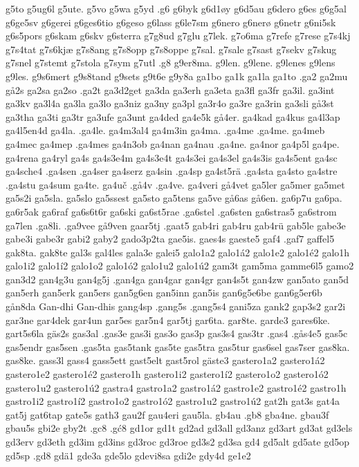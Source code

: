 g5to
g5ug6l
g5ute.
g5vo
g5wa
g5yd
.g6
g6byk
g6d1øy
g6d5au
g6dero
g6es
g6g5al
g6ge5sv
g6gerei
g6ges6tio
g6geso
g6lass
g6le7sm
g6nero
g6nerø
g6netr
g6ni5sk
g6s5pors
g6skam
g6skv
g6sterra
g7g8ud
g7glu
g7lek.
g7o6ma
g7refe
g7rese
g7s4kj
g7s4tat
g7s6kjæ
g7s8ang
g7s8opp
g7s8oppe
g7sal.
g7sale
g7sast
g7sekv
g7skug
g7snel
g7stemt
g7stola
g7sym
g7utl
.g8
g9er8ma.
g9len.
g9lene.
g9lenes
g9lens
g9les.
g9s6mert
g9s8tand
g9sets
g9t6e
g9y8a
ga1bo
ga1k
ga1la
ga1to
.ga2
ga2mu
gå2s
ga2sa
ga2so
.ga2t
ga3d2get
ga3da
ga3erh
ga3eta
ga3fl
ga3fr
ga3il.
ga3int
ga3kv
ga3l4a
ga3la
ga3lo
ga3niz
ga3ny
ga3pl
ga3r4o
ga3re
ga3rin
ga3sli
gå3st
ga3tha
ga3ti
ga3tr
ga3ufe
ga3unt
ga4ded
ga4e5k
gå4er.
ga4kad
ga4kus
ga4l3ap
ga4l5en4d
ga4la.
.ga4le.
ga4m3al4
ga4m3in
ga4ma.
.ga4me
.ga4me.
ga4meb
ga4mec
ga4mep
.ga4mes
ga4n3ob
ga4nan
ga4nau
.ga4ne.
ga4nor
ga4p5l
ga4pe.
ga4rena
ga4ryl
ga4s
ga4s3e4m
ga4s3e4t
ga4s3ei
ga4s3el
ga4s3is
ga4s5ent
ga4sc
ga4sche4
.ga4sen
.ga4ser
ga4serz
ga4sin
.ga4sp
ga4st5rä
.ga4sta
ga4sto
ga4stre
.ga4stu
ga4sum
ga4te.
ga4uč
.gå4v
.ga4ve.
ga4veri
gå4vet
ga5ler
ga5mer
ga5met
ga5s2i
ga5sla.
ga5slo
ga5ssest
ga5sto
ga5tens
ga5ve
gå6as
gå6en.
ga6p7u
ga6pa.
ga6r5ak
ga6raf
ga6s6t6r
ga6ski
ga6st5rae
.ga6stel
.ga6sten
ga6stras5
ga6strom
ga7len
.ga8li.
.ga9vee
gå9ven
gaar5tj
.gaat5
gab4ri
gab4ru
gab4rü
gab5le
gabe3e
gabe3i
gabe3r
gabi2
gaby2
gado3p2ta
gae5is.
gaes4s
gaeste5
gaf4
.gaf7
gaffel5
gak8ta.
gak8te
gal3s
gal4les
gala3e
galei5
galo1a2
galo1á2
galo1e2
galo1é2
galo1h
galo1i2
galo1í2
galo1o2
galo1ó2
galo1u2
galo1ú2
gam3t
gam5ma
gamme6l5
gamo2
gan3d2
gan4g3u
gan4g5j
.gan4ga
gan4gar
gan4gr
gan4s5t
gan4zw
gan5ato
gan5d
gan5erh
gan5erk
gan5ers
gan5g6en
gan5inn
gan5is
gan6g5e6be
gan6g5er6b
gån8da
Gan-dhi
Gan-dhis
gang4sp
.gang5s
.gang5s4
gani5za
gank2
gap3s2
gar2i
gar3ne
gar4dek
gar4un
gar5es
gar5n4
gar5tj
gar6ta.
gar8te.
garde3
gares6ke.
gart5s6la
gäs2s
gas3al
.gas3e
gas3i
gas3o
gas3p
gas3s4
gas3tr
.gas4
.gås4e5
gas5c
gas5endr
gas5sen
.gas5ta
gas5tank
gas5te
gas5tra
gas5tur
gas6sel
gas7ser
gas8ka.
gas8ke.
gass3l
gass4
gass5ett
gast5elt
gast5rol
gäste3
gastero1a2
gastero1á2
gastero1e2
gastero1é2
gastero1h
gastero1i2
gastero1í2
gastero1o2
gastero1ó2
gastero1u2
gastero1ú2
gastra4
gastro1a2
gastro1á2
gastro1e2
gastro1é2
gastro1h
gastro1i2
gastro1í2
gastro1o2
gastro1ó2
gastro1u2
gastro1ú2
gat2h
gat3s
gat4a
gat5j
gat6tap
gate5s
gath3
gau2f
gau4eri
gau5la.
gb4au
.gb8
gba4ne.
gbau3f
gbau5s
gbi2e
gby2t
.gc8
.gć8
gd1or
gd1t
gd2ad
gd3all
gd3anz
gd3art
gd3at
gd3els
gd3erv
gd3eth
gd3im
gd3ins
gd3roc
gd3roe
gd3s2
gd3sa
gd4
gd5alt
gd5ate
gd5op
gd5sp
.gd8
gdä1
gde3a
gde5lo
gdevi8sa
gdi2e
gdy4d
ge1e2
